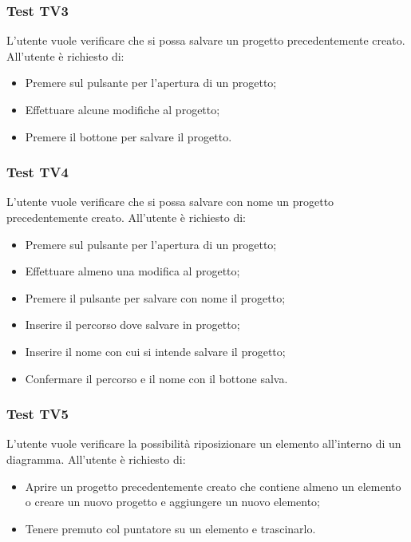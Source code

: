 \documentclass[../PianoDiQualifica.tex]{subfiles}
\begin{document}
	\subsubsection{Test TV3} 
	L'utente vuole verificare che si possa salvare un progetto precedentemente creato. 
	All'utente è richiesto di: 
	\begin{itemize} 
		\item Premere sul pulsante per l'apertura di un progetto; 
		\item Effettuare alcune modifiche al progetto; 
		\item Premere il bottone per salvare il progetto. 
	\end{itemize}   
  
	\subsubsection{Test TV4} 
	L'utente vuole verificare che si possa salvare con nome un progetto precedentemente creato. 
	All'utente è richiesto di: 
	\begin{itemize} 
		\item Premere sul pulsante per l'apertura di un progetto; 
		\item Effettuare almeno una modifica al progetto; 
		\item Premere il pulsante per salvare con nome il progetto; 
		\item Inserire il percorso dove salvare in progetto; 
		\item Inserire il nome con cui si intende salvare il progetto; 
		\item Confermare il percorso e il nome con il bottone salva.
	\end{itemize}     
	
	
	
	
	\subsubsection{Test TV5} 
	L'utente vuole verificare la possibilità riposizionare un elemento all'interno di un diagramma. 
	All'utente è richiesto di: 
	\begin{itemize} 
		\item Aprire un progetto precedentemente creato che contiene almeno un elemento o creare un nuovo progetto e aggiungere un nuovo elemento; 
		\item Tenere premuto col puntatore su un elemento e trascinarlo. 
	\end{itemize} 
	
\end{document}
